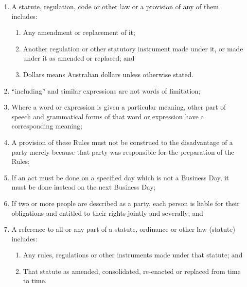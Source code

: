 \documentclass{article}
\begin{document}
\begin{enumerate}[label=\arabic*.]
\begin{enumerate}[label=\arabic{enumi}.\arabic*.]
\begin{enumerate}[label=(\arabic*)]
\item  A statute, regulation, code or other law or a provision of any of them includes:

\begin{enumerate}[label=(\alph*)]

\item  Any amendment or replacement of it;

\item  Another regulation or other statutory instrument made under it, or made under it as amended or replaced; and

\item  Dollars means Australian dollars unless otherwise stated.

\end{enumerate}

\item  “including” and similar expressions are not words of limitation;

\item  Where a word or expression is given a particular meaning, other part of speech and grammatical forms of that word or expression have a corresponding meaning;

\item  A provision of these Rules must not be construed to the disadvantage of a party merely because that party was responsible for the preparation of the Rules;

\item  If an act must be done on a specified day which is not a Business Day, it must be done instead on the next Business Day;

\item  If two or more people are described as a party, each person is liable for their obligations and entitled to their rights jointly and severally; and

\item  A reference to all or any part of a statute, ordinance or other law (statute) includes:

\begin{enumerate}[label=(\alph*)]

\item  Any rules, regulations or other instruments made under that statute; and

\item  That statute as amended, consolidated, re-enacted or replaced from time to time.

\end{enumerate}


\end{enumerate}
\end{enumerate}
\end{enumerate}
\end{document}
